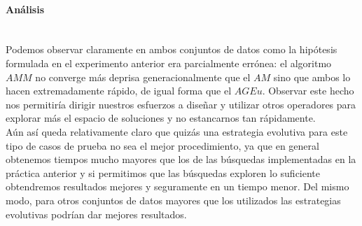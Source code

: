 \documentclass[11pt,a4paper]{article}
\begin{document}
	
	\paragraph{ Análisis } \ \\
	
	Podemos observar claramente en ambos conjuntos de datos como la hipótesis formulada en el experimento anterior era parcialmente errónea: el algoritmo $AMM$ no converge más deprisa generacionalmente que el $AM$ sino que ambos lo hacen extremadamente rápido, de igual forma que el $AGEu$. Observar este hecho nos permitiría dirigir nuestros esfuerzos a diseñar y utilizar otros operadores para explorar más el espacio de soluciones y no estancarnos tan rápidamente. \\
	
	Aún así queda relativamente claro que quizás una estrategia evolutiva para este tipo de casos de prueba no sea el mejor procedimiento, ya que en general obtenemos tiempos mucho mayores que los de las búsquedas implementadas en la práctica anterior y si permitimos que las búsquedas exploren lo suficiente obtendremos resultados mejores y seguramente en un tiempo menor. Del mismo modo, para otros conjuntos de datos mayores que los utilizados las estrategias evolutivas podrían dar mejores resultados.
\end{document}
